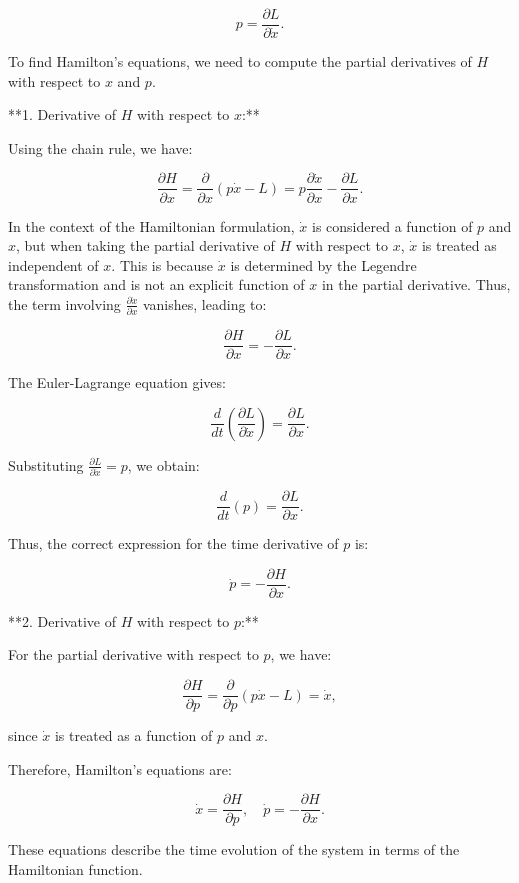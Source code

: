 \documentclass[11pt,a4paper]{article}
\begin{document}
$$
p = \frac{\partial L}{\partial \dot{x}}.
$$

To find Hamilton's equations, we need to compute the partial derivatives of \( H \) with respect to \( x \) and \( p \).

**1. Derivative of \( H \) with respect to \( x \):**

Using the chain rule, we have:

$$
\frac{\partial H}{\partial x} = \frac{\partial}{\partial x} (p \dot{x} - L) = p \frac{\partial \dot{x}}{\partial x} - \frac{\partial L}{\partial x}.
$$

In the context of the Hamiltonian formulation, \( \dot{x} \) is considered a function of \( p \) and \( x \), but when taking the partial derivative of \( H \) with respect to \( x \), \( \dot{x} \) is treated as independent of \( x \). This is because \( \dot{x} \) is determined by the Legendre transformation and is not an explicit function of \( x \) in the partial derivative. Thus, the term involving \( \frac{\partial \dot{x}}{\partial x} \) vanishes, leading to:

$$
\frac{\partial H}{\partial x} = -\frac{\partial L}{\partial x}.
$$

The Euler-Lagrange equation gives:

$$
\frac{d}{dt} \left( \frac{\partial L}{\partial \dot{x}} \right) = \frac{\partial L}{\partial x}.
$$

Substituting \( \frac{\partial L}{\partial \dot{x}} = p \), we obtain:

$$
\frac{d}{dt}(p) = \frac{\partial L}{\partial x}.
$$

Thus, the correct expression for the time derivative of \( p \) is:

$$
\dot{p} = -\frac{\partial H}{\partial x}.
$$

**2. Derivative of \( H \) with respect to \( p \):**

For the partial derivative with respect to \( p \), we have:

$$
\frac{\partial H}{\partial p} = \frac{\partial}{\partial p} (p \dot{x} - L) = \dot{x},
$$

since \( \dot{x} \) is treated as a function of \( p \) and \( x \).

Therefore, Hamilton's equations are:

$$
\dot{x} = \frac{\partial H}{\partial p}, \quad \dot{p} = -\frac{\partial H}{\partial x}.
$$

These equations describe the time evolution of the system in terms of the Hamiltonian function.
\end{document}
